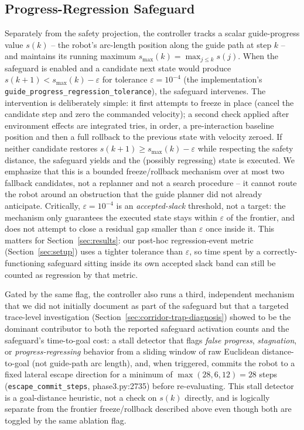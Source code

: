 \documentclass[conference,letterpaper,10pt]{ieeeconf}
\begin{document}
\subsection{Progress-Regression Safeguard}
\label{sec:safeguard}
Separately from the safety projection, the controller tracks a scalar
guide-progress value \(s(k)\) -- the robot's arc-length position along the
guide path at step \(k\) -- and maintains its running maximum
\(s_{\max}(k) = \max_{j \le k} s(j)\). When the safeguard is enabled and a
candidate next state would produce \(s(k+1) < s_{\max}(k) - \varepsilon\)
for tolerance \(\varepsilon = 10^{-4}\) (the implementation's
\texttt{guide\_progress\_regression\_tolerance}), the safeguard intervenes.
The intervention is deliberately simple: it first attempts to freeze in
place (cancel the candidate step and zero the commanded velocity); a
second check applied after environment effects are integrated tries, in
order, a pre-interaction baseline position and then a full rollback to the
previous state with velocity zeroed. If neither candidate restores
\(s(k+1) \ge s_{\max}(k) - \varepsilon\) while respecting the safety
distance, the safeguard yields and the (possibly regressing) state is
executed. We emphasize that this is a bounded freeze/rollback mechanism
over at most two fallback candidates, not a replanner and not a search
procedure -- it cannot route the robot around an obstruction that the
guide planner did not already anticipate. Critically, $\varepsilon =
10^{-4}$ is an \emph{accepted-slack} threshold, not a target: the
mechanism only guarantees the executed state stays within $\varepsilon$ of
the frontier, and does not attempt to close a residual gap smaller than
$\varepsilon$ once inside it. This matters for Section~\ref{sec:results}:
our post-hoc regression-event metric (Section~\ref{sec:setup}) uses a
tighter tolerance than $\varepsilon$, so time spent by a
correctly-functioning safeguard sitting inside its own accepted slack band
can still be counted as regression by that metric.

Gated by the same flag, the controller also runs a third, independent
mechanism that we did not initially document as part of the safeguard but
that a targeted trace-level investigation (Section~\ref{sec:corridor-trap-diagnosis})
showed to be the dominant contributor to both the reported safeguard
activation counts and the safeguard's time-to-goal cost: a stall detector
that flags \emph{false progress}, \emph{stagnation}, or
\emph{progress-regressing} behavior from a sliding window of raw
Euclidean distance-to-goal (not guide-path arc length), and, when
triggered, commits the robot to a fixed lateral escape direction for a
minimum of $\max(28, 6, 12) = 28$ steps (\texttt{escape\_commit\_steps},
phase3.py:2735) before re-evaluating. This stall detector is a
goal-distance heuristic, not a check on $s(k)$ directly, and is logically
separate from the frontier freeze/rollback described above even though
both are toggled by the same ablation flag.
\end{document}
